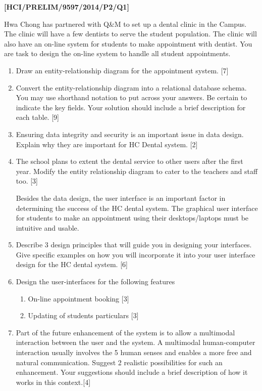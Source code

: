 \item \textbf{{[}HCI/PRELIM/9597/2014/P2/Q1{]} }

Hwa Chong has partnered with Q\&M to set up a dental clinic in the
Campus. The clinic will have a few dentists to serve the student population.
The clinic will also have an on-line system for students to make appointment
with dentist. You are task to design the on-line system to handle
all student appointments. 
\begin{enumerate}
\item Draw an entity-relationship diagram for the appointment system. \hfill{}{[}7{]}
\item Convert the entity-relationship diagram into a relational database
schema. You may use shorthand notation to put across your answers.
Be certain to indicate the key fields. Your solution should include
a brief description for each table. \hfill{}{[}9{]}
\item Ensuring data integrity and security is an important issue in data
design. Explain why they are important for HC Dental system. \hfill{}{[}2{]}
\item The school plans to extent the dental service to other users after
the first year. Modify the entity relationship diagram to cater to
the teachers and staff too. \hfill{}{[}3{]}

Besides the data design, the user interface is an important factor
in determining the success of the HC dental system. The graphical
user interface for students to make an appointment using their desktops/laptops
must be intuitive and usable. 
\item Describe 3 design principles that will guide you in designing your
interfaces. Give specific examples on how you will incorporate it
into your user interface design for the HC dental system. \hfill{}{[}6{]}
\item Design the user-interfaces for the following features 
\begin{enumerate}
\item On-line appointment booking \hfill{}{[}3{]}
\item Updating of students particulars \hfill{}{[}3{]}
\end{enumerate}
\item Part of the future enhancement of the system is to allow a multimodal
interaction between the user and the system. A multimodal human-computer
interaction usually involves the 5 human senses and enables a more
free and natural communication. Suggest 2 realistic possibilities
for such an enhancement. Your suggestions should include a brief description
of how it works in this context.\hfill{}{[}4{]}


\end{enumerate}
